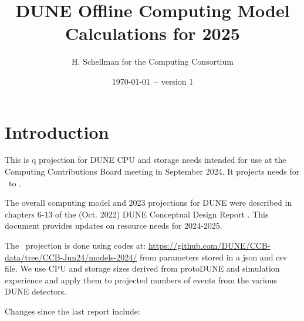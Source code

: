 \documentclass[12pt]{article}
\title{DUNE Offline Computing Model Calculations for 2025}
\author{H. Schellman for the Computing Consortium}
\date{\today\ -- version 1}
\newcommand{\csvautotabularright}[2][]{\csvloop{autotabularright={#2},#1}}
\begin{document}
\makeatletter

\maketitle



\section{Introduction}

This is q projection for DUNE CPU and storage needs intended for use at the Computing Contributions Board meeting in September 2024. It projects needs for \configRequestYear\ to \configMaxYear. 

The overall computing model  and 2023 projections for DUNE were described in chapters 6-13 of the  (Oct. 2022) DUNE Conceptual Design Report \cite{DUNE:2022fcw}.   This document provides updates on resource needs for 2024-2025. 

The \configRequestYear\ projection is done using codes at: \href{https://github.com/DUNE/CCB-data/tree/CCB-Jun24/models-2024/}{https://github.com/DUNE/CCB-data/tree/CCB-Jun24/models-2024/} from parameters stored in a json and csv file. We use CPU and storage sizes derived from protoDUNE and simulation experience and apply them to projected numbers of events from the various DUNE detectors. 







Changes since the last report \cite{CCB2024Report, CCB2024Minutes} include:
\end{document}
